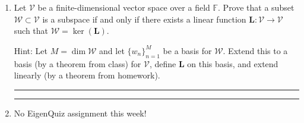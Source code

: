 \documentclass[12pt]{amsart}
\newcommand{\1}{\mathbbm{1}}
\numberwithin{equation}{section}
\numberwithin{Theorem}{section}
\theoremstyle{plain} %
\theoremstyle{definition}
\theoremstyle{remark}
\begin{document}
\begin{enumerate}[1.]
\bigskip

\item Let \(\mathcal{V}\) be a finite-dimensional vector space over a field \(\mathbb{F}\). Prove that a subset \(\mathcal{W}\subset\mathcal{V}\) is a subspace if and only if there exists a linear function \(\mathbf{L}:\mathcal{V}\to\mathcal{V}\) such that \(\mathcal{W}=\operatorname{ker}(\mathbf{L})\). 

Hint: Let \(M = \operatorname{dim}\mathcal{W}\) and let \(\{w_{n}\}_{n=1}^{M}\) be a basis for \(\mathcal{W}\). Extend this to a basis (by a theorem from class) for \(\mathcal{V}\), define \(\mathbf{L}\) on this basis, and extend linearly (by a theorem from homework).


\bigskip
\hrule
\bigskip

\bigskip
\hrule
\bigskip


\item No EigenQuiz assignment this week!

\end{enumerate}
\end{document}
